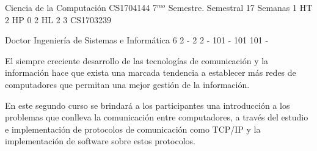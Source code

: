 \documentclass[a4paper,8pt]{article}
\begin{document}
\setNombreProfesor{}
\setGradoProfesorAbreviado{}
\sylabusHeader

\academicaTable
{Ciencia de la Computación} %
{CS1704144} %
{7$^{mo}$ Semestre.} %
{Semestral} %
{17 Semanas} %
{1 HT} %
{2 HP} %
{0} %
{2 HL}  %
{2} %
{3} %
{CS1703239} %

\administrativaTable
{Doctor} %
{Ingeniería de Sistemas e Informática} %
{6} %
{2} %
{-} %
{2} %
{2} %
{-} %
{101} %
{-} %
{101} %
{101} %
{-} %


\begin{fundamentacion}
El siempre creciente desarrollo de las tecnologías de comunicación y la
información hace que exista una marcada tendencia a  establecer
más redes de computadores que permitan una mejor
gestión de la información.

En este segundo curso se brindará a los participantes una introducción a los
problemas que conlleva la comunicación entre computadores, a través del
estudio e implementación de protocolos de comunicación como TCP/IP y
la implementación de software sobre estos protocolos.

\end{fundamentacion}

\begin{sumilla}
\item \NCIntroduction
\item \NCNetworkedApplications
\item \NCReliableDataDelivery
\item \NCRoutingandForwarding
\item \NCLocalAreaNetworks
\item \NCResourceAllocation
\item \NCMobility
\item \NCSocialNetworking

\end{sumilla}
\end{document}
